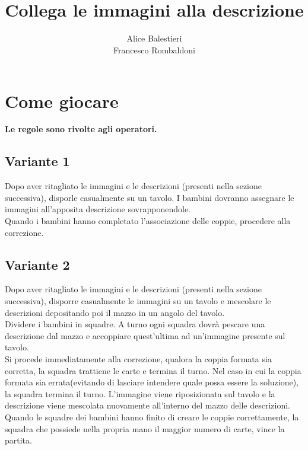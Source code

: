 \documentclass[hidelinks,12pt,a4paper]{article}
\begin{document}
	
	\title{\textbf{\\Collega le immagini alla descrizione}}
	\author{Alice Balestieri\\Francesco Rombaldoni}
	\date{}
	
	\maketitle
	\newpage
	
	\tableofcontents
	\newpage
	
	\section{Come giocare}
	\begin{center}
		\textbf{Le regole sono rivolte agli operatori.}
	\end{center}
	
	\subsection{Variante 1}
	 Dopo aver ritagliato le immagini e le descrizioni (presenti nella sezione successiva), disporle casualmente su un tavolo. I bambini dovranno assegnare le immagini all'apposita descrizione sovrapponendole.\\
	Quando i bambini hanno completato l'associazione delle coppie, procedere alla correzione.
	
	\subsection{Variante 2}
	Dopo aver ritagliato le immagini e le descrizioni (presenti nella sezione successiva), disporre casualmente le immagini su un tavolo e mescolare le descrizioni depositando poi il mazzo in un angolo del tavolo.\\
	Dividere i bambini in squadre. A turno ogni squadra dovrà pescare una descrizione dal mazzo e accoppiare quest'ultima ad un'immagine presente sul tavolo.\\
	Si procede immediatamente alla correzione, qualora la coppia formata sia corretta, la squadra trattiene le carte e termina il turno. Nel caso in cui la coppia formata sia errata(evitando di lasciare intendere quale possa essere la soluzione), la squadra termina il turno. L'immagine viene riposizionata sul tavolo e la descrizione viene mescolata nuovamente all'interno del mazzo delle descrizioni.\\
	Quando le squadre dei bambini hanno finito di creare le coppie correttamente, la squadra che possiede nella propria mano il maggior numero di carte, vince la partita.
	
\end{document}
